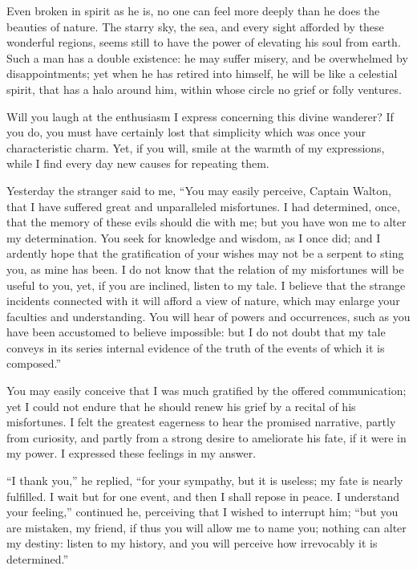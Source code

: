 Even broken in spirit as he is, no
one can feel more deeply than he does
the beauties of nature. The starry
sky, the sea, and every sight afforded
by these wonderful regions, seems still
to have the power of elevating his soul
from earth. Such a man has a double
existence: he may suffer misery, and
be overwhelmed by disappointments;
yet when he has retired into himself, he
will be like a celestial spirit, that has
a halo around him, within whose circle
no grief or folly ventures.

Will you laugh at the enthusiasm I
express concerning this divine wanderer?
If you do, you must have certainly
lost that simplicity which was
once your characteristic charm. Yet,
if you will, smile at the warmth of my
expressions, while I find every day new
causes for repeating them.


Yesterday the stranger said to me,
``You may easily perceive, Captain
Walton, that I have suffered great and
unparalleled misfortunes. I had determined,
once, that the memory of these
evils should die with me; but you
have won me to alter my determination.
You seek for knowledge and
wisdom, as I once did; and I ardently
hope that the gratification of your
wishes may not be a serpent to sting
you, as mine has been. I do not know
that the relation of my misfortunes will
be useful to you, yet, if you are inclined,
listen to my tale. I believe that the
strange incidents connected with it will
afford a view of nature, which may
enlarge your faculties and understanding.
You will hear of powers and
occurrences, such as you have been
accustomed to believe impossible: but
I do not doubt that my tale conveys in
its series internal evidence of the truth
of the events of which it is composed.''

You may easily conceive that I was
much gratified by the offered communication;
yet I could not endure that
he should renew his grief by a recital
of his misfortunes. I felt the greatest
eagerness to hear the promised narrative,
partly from curiosity, and partly
from a strong desire to ameliorate his
fate, if it were in my power. I
expressed these feelings in my answer.

``I thank you,'' he replied, ``for
your sympathy, but it is useless; my
fate is nearly fulfilled. I wait but for
one event, and then I shall repose in
peace. I understand your feeling,''
continued he, perceiving that I wished
to interrupt him; ``but you are mistaken,
my friend, if thus you will allow
me to name you; nothing can alter my
destiny: listen to my history, and you
will perceive how irrevocably it is determined.''

